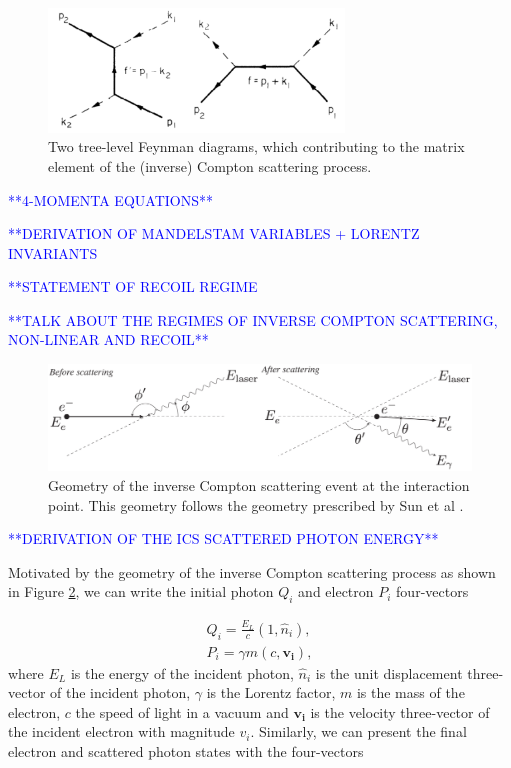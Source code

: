\documentclass[../main.tex]{subfiles}
\begin{document}
\begin{figure}[!htb]
    \centering\includegraphics[width=0.7\textwidth]{Figures/Theory_of_Photon_Production_by_Inverse_Compton_Scattering/Berestetskii_ICS_Feynman.pdf}
    \caption{Two tree-level Feynman diagrams, which contributing to the matrix element of the (inverse) Compton scattering process. \cite{berestetskii1982quantum}}
    \label{fig:ICS_Feynman_diagrams}
\end{figure}

\textcolor{blue}{**4-MOMENTA EQUATIONS**}

\textcolor{blue}{**DERIVATION OF MANDELSTAM VARIABLES + LORENTZ INVARIANTS }

\textcolor{blue}{**STATEMENT OF RECOIL REGIME}

\textcolor{blue}{**TALK ABOUT THE REGIMES OF INVERSE COMPTON SCATTERING, NON-LINEAR AND RECOIL**}

\begin{figure}[!htb]
    \centering
    \includegraphics[width=\textwidth]{Figures/Theory_of_Photon_Production_by_Inverse_Compton_Scattering/scatteringkinematicsdiagram.pdf}
    \caption{Geometry of the inverse Compton scattering event at the interaction point. This geometry follows the geometry prescribed by Sun et al \cite{sun2009energy}. }
    \label{fig:scattered_photon_kinematics}
\end{figure}

\textcolor{blue}{**DERIVATION OF THE ICS SCATTERED PHOTON ENERGY**}

Motivated by the geometry of the inverse Compton scattering process as shown in Figure \ref{fig:scattered_photon_kinematics}, we can write the initial photon $Q_{i}$ and electron $P_{i}$ four-vectors

\begin{align}
Q_{i} = \frac{E_{L}}{c}\left(1,\hat{n}_{i}\right), \\
P_{i} = \gamma m\left(c,\boldsymbol{v_{i}}\right),
\label{eq:initial_four_vectors}
\end{align}
where $E_{L}$ is the energy of the incident photon, $\hat{n}_{i}$ is the unit displacement three-vector of the incident photon, $\gamma$ is the Lorentz factor, $m$ is the mass of the electron, $c$ the speed of light in a vacuum and $\boldsymbol{v_{i}}$ is the velocity three-vector of the incident electron with magnitude $v_{i}$. Similarly, we can present the final electron and scattered photon states with the four-vectors 
\end{document}
